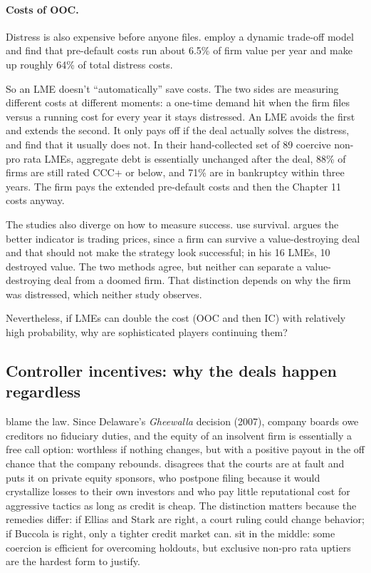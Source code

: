 \documentclass[12pt]{article}
\begin{document}
\paragraph{Costs of OOC.} Distress is also expensive before anyone files. \citet{elkamhi2024} employ a dynamic trade-off model and find that pre-default costs run about 6.5\% of firm value per year and make up roughly 64\% of total distress costs.

So an LME doesn't ``automatically'' save costs. The two sides are measuring different costs at different moments: a one-time demand hit when the firm files versus a running cost for every year it stays distressed. An LME avoids the first and extends the second. It only pays off if the deal actually solves the distress, and \citet{roerotaru2026} find that it usually does not. In their hand-collected set of 89 coercive non-pro rata LMEs, aggregate debt is essentially unchanged after the deal, 88\% of firms are still rated CCC+ or below, and 71\% are in bankruptcy within three years. The firm pays the extended pre-default costs and then the Chapter 11 costs anyway.

The studies also diverge on how to measure success. \citet{roerotaru2026} use survival. \citet{harmon2026} argues the better indicator is trading prices, since a firm can survive a value-destroying deal and that should not make the strategy look successful; in his 16 LMEs, 10 destroyed value. The two methods agree, but neither can separate a value-destroying deal from a doomed firm. That distinction depends on why the firm was distressed, which neither study observes.

Nevertheless, if LMEs can double the cost (OOC and then IC) with relatively high probability, why are sophisticated players continuing them?

\subsection{Controller incentives: why the deals happen regardless}

\citet{ellias2020} blame the law. Since Delaware's \emph{Gheewalla} decision (2007), company boards owe creditors no fiduciary duties, and the equity of an insolvent firm is essentially a free call option: worthless if nothing changes, but with a positive payout in the off chance that the company rebounds. \citet{buccola2023} disagrees that the courts are at fault and puts it on private equity sponsors, who postpone filing because it would crystallize losses to their own investors and who pay little reputational cost for aggressive tactics as long as credit is cheap. The distinction matters because the remedies differ: if Ellias and Stark are right, a court ruling could change behavior; if Buccola is right, only a tighter credit market can. \citet{buccolakahan2025} sit in the middle: some coercion is efficient for overcoming holdouts, but exclusive non-pro rata uptiers are the hardest form to justify.
\end{document}
